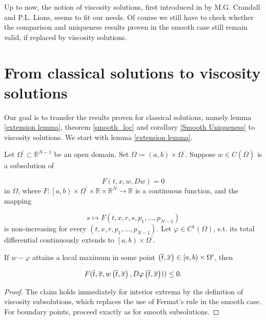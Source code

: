 	Up to now, the notion of viscosity solutions, first introduced in \cite{lions} by M.G. Crandall and P.L. Lions, seems to fit our needs. Of course we still have to check whether the comparison and uniqueness results proven in the smooth case still remain valid, if replaced by viscosity solutions.
	
	\section{From classical solutions to viscosity solutions}
	Our goal is to transfer the results proven for classical solutions, namely lemma \ref{extension lemma}, theorem \ref{smooth_loc} and corollary \ref{Smooth Uniqueness} to viscosity solutions. We start with lemma \ref{extension lemma}.
	
	\begin{lemma}
		\label{extension lemma viscosity}
		Let $ \Omega^{\prime} \subset \mathbb{R}^{N-1} $ be an open domain. Set $ \Omega \coloneqq \left( a, b \right) \times \Omega^{\prime} $. Suppose $ w \in C (\overline{\Omega})$ is a subsolution of
		
		\begin{equation*}
		F(t, x, w, Dw) = 0
		\end{equation*}
		in $ \Omega $, where $ F : \left[ a, b \right) \times \Omega^{\prime} \times \mathbb{R} \times \mathbb{R}^{N} \to \mathbb{R} $ is a continuous function, and the mapping
		
		\begin{equation*}
		s \mapsto F(t, x, r, s, p_1, \ldots, p_{N-1})
		\end{equation*}
		is non-increasing for every $ (t, x, r, p_1, \ldots, p_{N-1}) $. Let $ \varphi \in C^{1} \left( \Omega \right) $, s.t. its total differential continuously extends to $ \left[a, b\right) \times \Omega^{\prime} $.
		
		If $ w - \varphi $ attains a local maximum in some point $ \left(\overline{t}, \overline{x}\right) \in \left[a, b\right) \times \Omega^{\prime} $, then
		
		\begin{equation*}
		F(\overline{t}, \overline{x}, w\left(\overline{t}, \overline{x}\right), D\varphi\left(\overline{t}, \overline{x}\right))) \leq 0.
		\end{equation*}
		
		\begin{proof}
			The claim holds immediately for interior extrema by the definition of viscosity subsolutions, which replaces the use of Fermat's rule in the smooth case. For boundary points, proceed exactly as for smooth subsolutions.
		\end{proof}
	\end{lemma}

